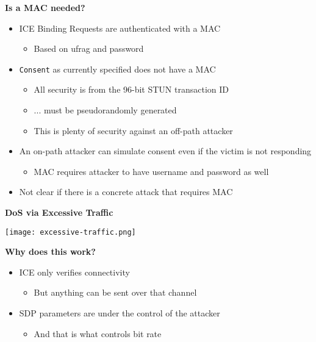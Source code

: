 \documentclass[helvetica]{seminar}
\newcommand{\heading}[1]{%
  \begin{center} 
    \large\bf 
    #1 
  \end{center} 
  \vspace{.4 in}}
\begin{document}
\begin{slide}
\heading{Is a MAC needed?}

\begin{itemize}
\item ICE Binding Requests are authenticated with a MAC
  \begin{itemize}
  \item Based on ufrag and password
  \end{itemize}

\item \verb^Consent^ as currently specified does not have a MAC
  \begin{itemize}
  \item All security is from the 96-bit STUN transaction ID
  \item ... must be pseudorandomly generated
  \item This is plenty of security against an off-path attacker
  \end{itemize}

\item An on-path attacker can simulate consent even if the victim is not responding
  \begin{itemize}
  \item MAC requires attacker to have username and password as well
  \end{itemize}

\item Not clear if there is a concrete attack that requires MAC
\end{itemize}
\end{slide}


\begin{slide}
\heading{DoS via Excessive Traffic}

{\centering
\noindent\texttt{[image: excessive-traffic.png]}
}
\end{slide}



\begin{slide}
\heading{Why does this work?}

\begin{itemize}
\item ICE only verifies connectivity
  \begin{itemize}
  \item But anything can be sent over that channel
  \end{itemize}


\item SDP parameters are under the control of the attacker
  \begin{itemize}
  \item And that is what controls bit rate
  \end{itemize}
\end{itemize}
\end{slide}
\end{document}
